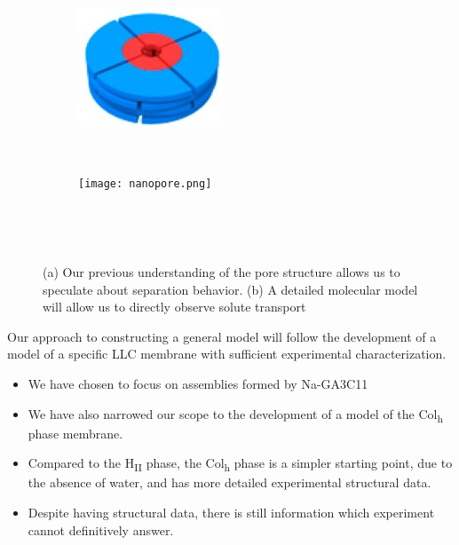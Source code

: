 \documentclass{article}
\begin{document}
  \begin{figure}[ht]
  \centering
	\begin{subfigure}{0.45\linewidth}
		\centering
		\includegraphics[width=\textwidth]{nanopore_undetailed.jpg}
		\caption{}~\label{fig:undetailed_pore}
	\end{subfigure}
	\begin{subfigure}{0.45\linewidth}
		\centering
		\texttt{[image: nanopore.png]}
		\caption{}~\label{fig:detailed_pore}
	\end{subfigure}
  \caption{(a) Our previous understanding of the pore structure allows us to speculate
	   about separation behavior. (b) A detailed molecular model will allow us to
	   directly observe solute transport}~\label{fig:detail}
  \end{figure} 
	
  
  Our approach to constructing a general model will follow the development of a
  model of a specific LLC membrane with sufficient experimental characterization.
    \begin{itemize}
	    \item We have chosen to focus on assemblies formed by Na-GA3C11
	    \item We have also narrowed our scope to the development of 
	    a model of the Col\textsubscript{h} phase membrane.
	    \item Compared to the H\textsubscript{II} phase, the Col\textsubscript{h}
	    phase is a simpler starting point, due to the absence of water, and has
	    more detailed experimental structural data.  %
	    \item Despite having structural data, there is still information which 
	    experiment cannot definitively answer.
    \end{itemize}
\end{document}
